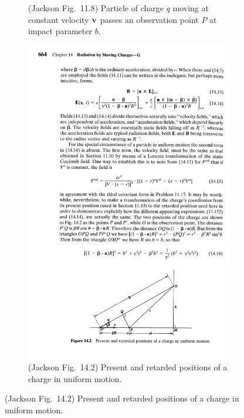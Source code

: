 \begin{figure}[b!]
\begin{minipage}{0.475\textwidth}
\begin{figure}[H]
			\caption{(Jackson Fig.~11.8) Particle of charge $q$ moving at constant velocity $\vb{v}$ passes an observation point $P$ at impact parameter $b$.}
			\label{11.8}
		\end{figure}
	\end{minipage}%
	\hspace{0.05\linewidth}%
	\begin{minipage}{0.475\textwidth} \centering
		\begin{figure}[H]
			\includegraphics{14-2}
			\caption{(Jackson Fig.~14.2) Present and retarded positions of a charge in uniform motion. \vspace{28pt}}
			\label{14.2}
		\end{figure}
	\end{minipage}
\end{figure}

